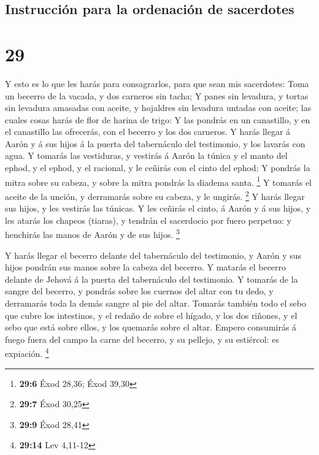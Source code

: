 \hypertarget{instrucciuxf3n-para-la-ordenaciuxf3n-de-sacerdotes}{%
\subsection{Instrucción para la ordenación de
sacerdotes}\label{instrucciuxf3n-para-la-ordenaciuxf3n-de-sacerdotes}}

\hypertarget{section-28}{%
\section{29}\label{section-28}}

 Y esto es lo que les harás para consagrarlos, para que
sean mis sacerdotes: Toma un becerro de la vacada, y dos carneros sin
tacha;  Y panes sin levadura, y tortas sin levadura
amasadas con aceite, y hojaldres sin levadura untadas con aceite; las
cuales cosas harás de flor de harina de trigo:  Y las
pondrás en un canastillo, y en el canastillo las ofrecerás, con el
becerro y los dos carneros.  Y harás llegar á Aarón y á
sus hijos á la puerta del tabernáculo del testimonio, y los lavarás con
agua.  Y tomarás las vestiduras, y vestirás á Aarón la
túnica y el manto del ephod, y el ephod, y el racional, y le ceñirás con
el cinto del ephod;  Y pondrás la mitra sobre su cabeza, y
sobre la mitra pondrás la diadema santa. \footnote{\textbf{29:6} Éxod
  28,36; Éxod 39,30}  Y tomarás el aceite de la unción, y
derramarás sobre su cabeza, y le ungirás. \footnote{\textbf{29:7} Éxod
  30,25}  Y harás llegar sus hijos, y les vestirás las
túnicas.  Y les ceñirás el cinto, á Aarón y á sus hijos, y
les atarás los chapeos (tiaras), y tendrán el sacerdocio por fuero
perpetuo: y henchirás las manos de Aarón y de sus hijos. \footnote{\textbf{29:9}
  Éxod 28,41}

 Y harás llegar el becerro delante del tabernáculo del
testimonio, y Aarón y sus hijos pondrán sus manos sobre la cabeza del
becerro.  Y matarás el becerro delante de Jehová á la
puerta del tabernáculo del testimonio.  Y tomarás de la
sangre del becerro, y pondrás sobre los cuernos del altar con tu dedo, y
derramarás toda la demás sangre al pie del altar. 
Tomarás también todo el sebo que cubre los intestinos, y el redaño de
sobre el hígado, y los dos riñones, y el sebo que está sobre ellos, y
los quemarás sobre el altar.  Empero consumirás á fuego
fuera del campo la carne del becerro, y su pellejo, y su estiércol: es
expiación. \footnote{\textbf{29:14} Lev 4,11-12}

